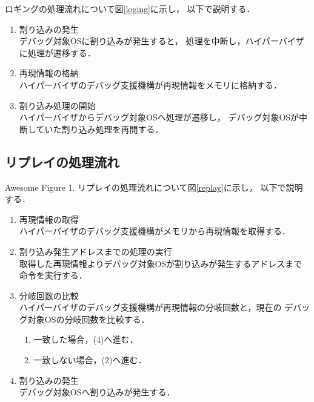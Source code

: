 \documentclass[tanilab-enum]{graduate}
\begin{document}
ロギングの処理流れについて図\ref{loging}に示し，
以下で説明する．
\begin{enumerate}
    \item 割り込みの発生\\
        デバッグ対象OSに割り込みが発生すると，
        処理を中断し，ハイパーバイザに処理が遷移する．
    \item 再現情報の格納\\
        ハイパーバイザのデバッグ支援機構が再現情報をメモリに格納する．
    \item 割り込み処理の開始\\
        ハイパーバイザからデバッグ対象OSへ処理が遷移し，
        デバッグ対象OSが中断していた割り込み処理を再開する．
\end{enumerate}
\subsection{リプレイの処理流れ}
{Awesome Figure 1.} 
リプレイの処理流れについて図\ref{replay}に示し，
以下で説明する．
\begin{enumerate}
    \item 再現情報の取得\\
        ハイパーバイザのデバッグ支援機構がメモリから再現情報を取得する．
    \item 割り込み発生アドレスまでの処理の実行\\
        取得した再現情報よりデバッグ対象OSが割り込みが発生するアドレスまで
        命令を実行する．
    \item 分岐回数の比較\\
        ハイパーバイザのデバッグ支援機構が再現情報の分岐回数と，現在の
        デバッグ対象OSの分岐回数を比較する．
        \begin{enumerate}
            \item 一致した場合，(4)へ進む．
            \item 一致しない場合，(2)へ進む．
        \end{enumerate}
    \item 割り込みの発生\\
        デバッグ対象OSへ割り込みが発生する．
\end{enumerate}
    
\end{document}

